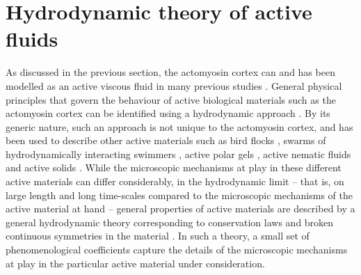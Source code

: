 \section{Hydrodynamic theory of active fluids}\label{sec:introHydrodynamicTheoryActiveFluids}
As discussed in the previous section, the actomyosin cortex can and has been modelled as an active viscous fluid in many previous studies \citep{kumar2021actomyosin,salbreux2012actin,bois2011pattern,saha2016determining,mayer2010anisotropies,fritzsche2016actin,julicher2018hydrodynamic}. General physical principles that govern the behaviour of active biological materials such as the actomyosin cortex can be identified using a hydrodynamic approach \citep{de2013non,julicher2018hydrodynamic,bois2011pattern,gross2017active,reymann2016cortical,kruse2004Asters,salbreux2012actin,julicher2022surface,Kruse2005GenericTO,Prost2015ActiveGP}. By its generic nature, such an approach is not unique to the actomyosin cortex, and has been used to describe other active materials such as bird flocks \citep{toner1995long,toner1998flocks,tu1998sound}, swarms of hydrodynamically interacting swimmers \citep{simha2002hydrodynamic,hatwalne2004rheology}, active polar gels \citep{Prost2015ActiveGP,kruse2004Asters,Kruse2005GenericTO,elgeti2011defect,julicher2018hydrodynamic,julicher2022surface}, active nematic fluids \citep{marenduzzo2007hydrodynamics,fielding2011nonlinear,giomi2011excitable,julicher2018hydrodynamic,julicher2022surface} and active solids \citep{gunther2007spontaneous,banerjee2011instabilities,ranft2010fluidization,julicher2018hydrodynamic}. While the microscopic mechanisms at play in these different active materials can differ considerably, in the hydrodynamic limit -- that is, on large length and long time-scales compared to the microscopic mechanisms of the active material at hand -- general properties of active materials are described by a general hydrodynamic theory corresponding to conservation laws and broken continuous symmetries in the material \citep{julicher2018hydrodynamic,julicher2022surface,Kruse2005GenericTO,Prost2015ActiveGP,de2013non}. In such a theory, a small set of phenomenological coefficients capture the details of the microscopic mechanisms at play in the particular active material under consideration.

